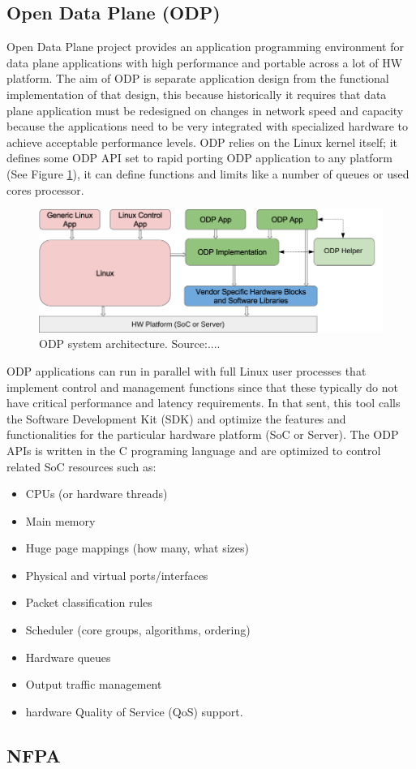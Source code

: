 \subsection{Open Data Plane (ODP)}
Open Data Plane project provides an application programming environment for data plane applications with high performance and portable across a lot of HW platform.
The aim of ODP is separate application design from the functional implementation of that design, this because historically it requires that data plane application must be redesigned on changes in network speed and capacity because the applications need to be very integrated with specialized hardware to achieve acceptable performance levels.
ODP relies on the Linux kernel itself; it defines some ODP API set to rapid porting ODP application to any platform (See Figure \ref{fig:sys_arch}), it can define functions and limits like a number of queues or used cores processor.\\
\begin{figure}[!ht]
	\centering
	\includegraphics[width=0.6\linewidth]
     {figures/odp-overview.png}
 	\caption{ODP system architecture. Source:....}
	\label{fig:sys_arch}
\end{figure}
ODP applications can run in parallel with full Linux user processes that implement control and management functions since that these typically do not have critical performance and latency requirements. In that sent, this tool calls the Software Development Kit (SDK) and optimize the features and functionalities for the particular hardware platform (SoC or Server).
The ODP APIs is written in the C programing language and are optimized to control related SoC resources such as:
\begin{itemize}
\item CPUs (or hardware threads) 
\item Main memory
\item Huge page mappings (how many, what sizes) 
\item Physical and virtual ports/interfaces 
\item Packet classification rules 
\item Scheduler (core groups, algorithms, ordering) 
\item Hardware queues 
\item Output traffic management 
\item hardware Quality of Service (QoS) support. 

\end{itemize}

\subsection{NFPA}

